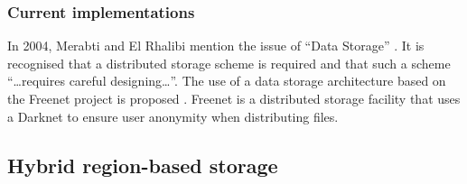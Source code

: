 \documentclass[10pt,a4paper,journal,cspaper,compsoc]{IEEEtran}
\begin{document}
\subsubsection{Current implementations}

In 2004, Merabti and El Rhalibi mention the issue of ``Data Storage'' \cite{using_freenet_storage}. It is recognised that a distributed storage
scheme is required and that such a scheme ``\ldots requires careful designing\ldots''. The use of a data storage architecture based on the Freenet
project is proposed \cite{clarke_freenet}. Freenet is a distributed storage facility that uses a Darknet to ensure user anonymity when distributing
files. %



\subsection{Hybrid region-based storage}
\label{hybrid_storage}
\end{document}
